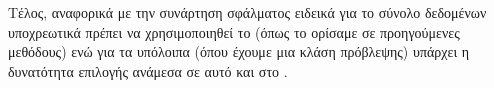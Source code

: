 Τέλος, αναφορικά με την συνάρτηση σφάλματος ειδεικά για το σύνολο δεδομένων υποχρεωτικά πρέπει να χρησιμοποιηθεί  το (όπως το ορίσαμε σε προηγούμενες μεθόδους) ενώ για τα υπόλοιπα (όπου έχουμε μια κλάση πρόβλεψης) υπάρχει η δυνατότητα επιλογής ανάμεσα σε αυτό και στο .\par

